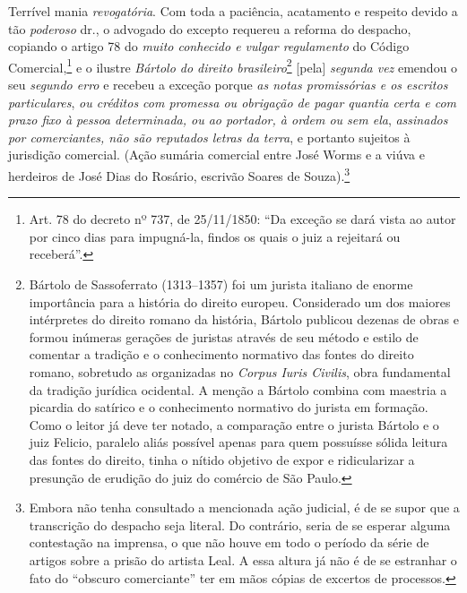 Terrível mania \emph{revogatória}. Com toda a paciência, acatamento e
respeito devido a tão \emph{poderoso} dr., o advogado do excepto
requereu a reforma do despacho, copiando o artigo 78 do \emph{muito
conhecido e vulgar regulamento} do Código Comercial,\footnote{ Art. 78
  do decreto nº 737, de 25/11/1850: ``Da exceção se dará vista ao autor
  por cinco dias para impugná-la, findos os quais o juiz a rejeitará ou
  receberá''.} e o ilustre \emph{Bártolo do direito
brasileiro}\footnote{ Bártolo de Sassoferrato (1313--1357) foi um
  jurista italiano de enorme importância para a história do direito
  europeu. Considerado um dos maiores intérpretes do direito romano da
  história, Bártolo publicou dezenas de obras e formou inúmeras gerações
  de juristas através de seu método e estilo de comentar a tradição e o
  conhecimento normativo das fontes do direito romano, sobretudo as
  organizadas no \emph{Corpus Iuris Civilis}, obra fundamental da
  tradição jurídica ocidental. A menção a Bártolo combina com maestria a
  picardia do satírico e o conhecimento normativo do jurista em
  formação. Como o leitor já deve ter notado, a comparação entre o
  jurista Bártolo e o juiz Felicio, paralelo aliás possível apenas para
  quem possuísse sólida leitura das fontes do direito, tinha o nítido
  objetivo de expor e ridicularizar a presunção de erudição do juiz do
  comércio de São Paulo.} {[}pela{]} \emph{segunda vez} emendou o seu
\emph{segundo erro} e recebeu a exceção porque \emph{as notas
promissórias e os escritos particulares}, \emph{ou créditos com promessa
ou obrigação de pagar quantia certa e com prazo fixo à pessoa
determinada, ou ao portador, à ordem ou sem ela}, \emph{assinados por
comerciantes, não são reputados letras da terra}, e portanto sujeitos à
jurisdição comercial. (Ação sumária comercial entre José Worms e a viúva
e herdeiros de José Dias do Rosário, escrivão Soares de
Souza).\footnote{ Embora não tenha consultado a mencionada ação
  judicial, é de se supor que a transcrição do despacho seja literal. Do
  contrário, seria de se esperar alguma contestação na imprensa, o que
  não houve em todo o período da série de artigos sobre a prisão do
  artista Leal. A essa altura já não é de se estranhar o fato do
  ``obscuro comerciante'' ter em mãos cópias de excertos de processos.}

